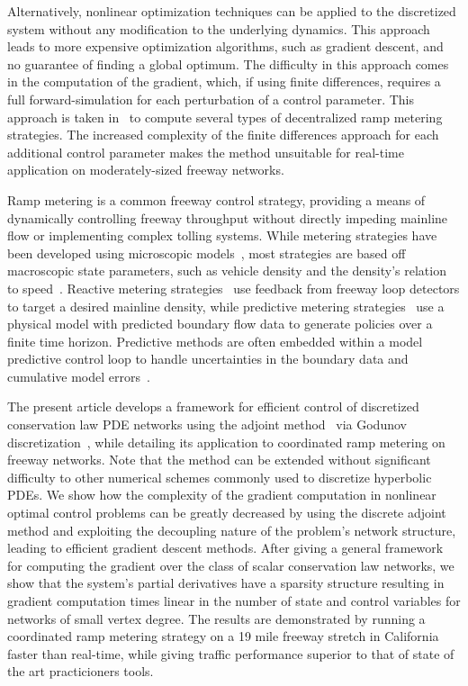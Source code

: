 Alternatively, nonlinear optimization techniques can be applied to the 
discretized system without any modification to the underlying dynamics. This 
approach leads to more expensive optimization algorithms, such as gradient 
descent, and no guarantee of finding a global optimum. The difficulty in this 
approach comes in the computation of the gradient, which, if using finite 
differences, requires a full forward-simulation for each perturbation of a 
control parameter. This approach is taken in~\cite{Ramon2013,Frejo2011} to 
compute several types of decentralized ramp metering strategies. The increased 
complexity of the finite differences approach for each additional control 
parameter makes the method unsuitable for real-time application on 
moderately-sized freeway networks.

Ramp metering is a common freeway control strategy, providing a means of 
dynamically controlling freeway throughput without directly impeding mainline 
flow or implementing complex tolling systems. While metering strategies have 
been developed using microscopic models~\cite{Ben-Akiva2003}, most strategies 
are based off macroscopic state parameters, such as vehicle density and the 
density's relation to 
speed~\cite{richards1956shock,lighthill1955kinematic,daganzo1995cell}. Reactive 
metering strategies~\cite{Papageorgiou1991,Papamichail,Kachroo2003} use 
feedback from freeway loop detectors to target a desired mainline density, 
while predictive metering 
strategies~\cite{Frejo2011,Kotsialos2004,gomes2006optimal,Chen1997} use a 
physical model with predicted boundary flow data to generate policies over a 
finite time horizon. Predictive methods are often embedded within a model 
predictive control loop to handle uncertainties in the boundary data and 
cumulative model errors~\cite{Muralidharana}.

The present article develops a framework for efficient control of discretized 
conservation law PDE networks using the adjoint 
method~\cite{Giles2000,Pironneau1974} via Godunov 
discretization~\cite{godunov1959}, while detailing its application to 
coordinated ramp metering on freeway networks. Note that the method can be 
extended without significant difficulty to other numerical schemes commonly 
used to discretize hyperbolic PDEs. We show how the complexity of 
the gradient computation in nonlinear optimal control problems can be greatly 
decreased by using the discrete adjoint method and exploiting the decoupling 
nature of the problem's network structure, leading to efficient gradient 
descent methods. After giving a general framework for computing the gradient 
over the class of scalar conservation law networks, we show that the system's 
partial derivatives have a sparsity structure resulting in gradient computation 
times linear in the number of state and control variables for networks of small 
vertex degree. The results are 
demonstrated by running a coordinated ramp metering strategy on a 19 mile 
freeway stretch in California faster than real-time, while giving traffic 
performance superior to that of state of the art practicioners tools.

